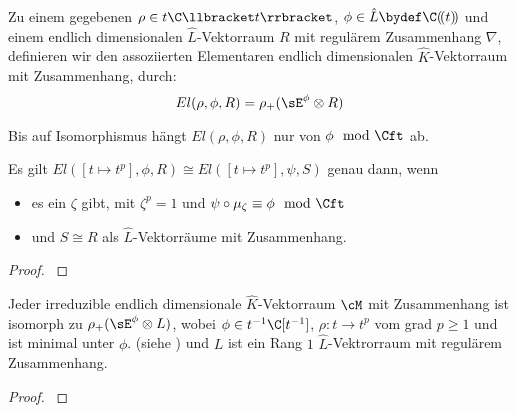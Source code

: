 \begin{defn}
\cite[Def 2.1]{sabbah_Fourier-local}
\begin{comment}
Alternative. ausfürlichere / komplexe definition \cite[Def 5.4.5.]{sabbah_cimpa90}
\end{comment}
Zu einem gegebenen $\rho\in t\C\llbracket t\rrbracket$, $\phi\in \hat L \bydef
\C(\!(t)\!)$ und einem endlich dimensionalen $\hat L$-Vektorraum $R$ mit
regulärem Zusammenhang $\nabla$, definieren wir den assoziierten Elementaren
endlich dimensionalen $\hat K$-Vektorraum mit Zusammenhang, durch:
\[
El(\rho,\phi,R)=\rho_+(\sE^\phi\otimes R)
\]
\end{defn}
\cite[nach Def 2.1]{sabbah_Fourier-local}
Bis auf Isomorphismus hängt $El(\rho,\phi,R)$ nur von $\phi\mod\Cft$ ab.
\begin{lem}
\cite[Lem 2.2]{sabbah_Fourier-local}
\end{lem}
%
%
\begin{lem} \cite[Lem 2.6.]{sabbah_Fourier-local}
Es gilt $El([t\mapsto t^p],\phi,R)\cong El([t\mapsto t^p],\psi,S)$ genau dann,
wenn
\begin{itemize}
\item es ein $\zeta$ gibt, mit $\zeta^p=1$ und
$\psi\circ\mu_\zeta\equiv\phi\mod\Cft$
\item und $S\cong R$ als $\hat L$-Vektorräume mit Zusammenhang.
\end{itemize}
\end{lem}
\begin{proof}
\cite[Lem 2.6.]{sabbah_Fourier-local}
\end{proof}
%
\begin{prop} \cite[Prop 3.1]{sabbah_Fourier-local}
Jeder irreduzible endlich dimensionale $\hat K$-Vektorraum $\cM$ mit
Zusammenhang ist isomorph zu $\rho_+(\sE^\phi\otimes L)$, wobei $\phi\in
t^{-1}\C[t^{-1}]$, $\rho:t\rightarrow t^p$ vom grad $p\geq 1$ und ist minimal
unter $\phi$. (siehe \cite[Rem  2.8]{sabbah_Fourier-local}) und $L$ ist ein
Rang $1$ $\hat L$-Vektrorraum mit regulärem Zusammenhang.
\end{prop}
\begin{proof}
\cite[Prop 3.1]{sabbah_Fourier-local}
\end{proof}

